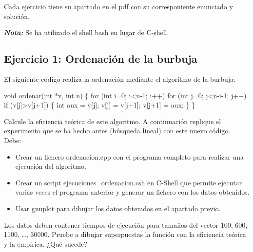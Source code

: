 \documentclass[]{article}
\newenvironment{Shaded}{\begin{snugshade}}{\end{snugshade}}
\newcommand{\KeywordTok}[1]{\textcolor[rgb]{0.94,0.87,0.69}{{#1}}}
\newcommand{\DataTypeTok}[1]{\textcolor[rgb]{0.87,0.87,0.75}{{#1}}}
\newcommand{\DecValTok}[1]{\textcolor[rgb]{0.86,0.86,0.80}{{#1}}}
\newcommand{\NormalTok}[1]{\textcolor[rgb]{0.80,0.80,0.80}{{#1}}}
\begin{document}
Cada ejercicio tiene su apartado en el pdf con su corresponiente
enunciado y solución.

\textbf{\emph{Nota:}} Se ha utilizado el shell bash en lugar de C-shell.

\subsection{Ejercicio 1: Ordenación de la
burbuja}\label{ejercicio-1-ordenacion-de-la-burbuja}

El siguiente código realiza la ordenación mediante el algoritmo de la
burbuja:

\begin{Shaded}
\begin{Highlighting}[]
\DataTypeTok{void} \NormalTok{ordenar(}\DataTypeTok{int} \NormalTok{*v, }\DataTypeTok{int} \NormalTok{n) \{}
    \KeywordTok{for} \NormalTok{(}\DataTypeTok{int} \NormalTok{i=}\DecValTok{0}\NormalTok{; i<n}\DecValTok{-1}\NormalTok{; i++)}
        \KeywordTok{for} \NormalTok{(}\DataTypeTok{int} \NormalTok{j=}\DecValTok{0}\NormalTok{; j<n-i}\DecValTok{-1}\NormalTok{; j++)}
            \KeywordTok{if} \NormalTok{(v[j]>v[j}\DecValTok{+1}\NormalTok{]) \{}
                \DataTypeTok{int} \NormalTok{aux = v[j];}
                \NormalTok{v[j] = v[j}\DecValTok{+1}\NormalTok{];}
                \NormalTok{v[j}\DecValTok{+1}\NormalTok{] = aux;}
            \NormalTok{\}}
\NormalTok{\}}
\end{Highlighting}
\end{Shaded}

Calcule la eficiencia teórica de este algoritmo. A continuación replique
el experimento que se ha hecho antes (búsqueda lineal) con este nuevo
código. Debe:

\begin{itemize}
\item
  Crear un fichero ordenacion.cpp con el programa completo para realizar
  una ejecución del algoritmo.
\item
  Crear un script ejecuciones\_ordenacion.csh en C-Shell que permite
  ejecutar varias veces el programa anterior y generar un fichero con
  los datos obtenidos.
\item
  Usar gnuplot para dibujar los datos obtenidos en el apartado previo.
\end{itemize}

Los datos deben contener tiempos de ejecución para tamaños del vector
100, 600, 1100, \ldots{}, 30000. Pruebe a dibujar superpuestas la
función con la eficiencia teórica y la empírica. ¿Qué sucede?
\end{document}
